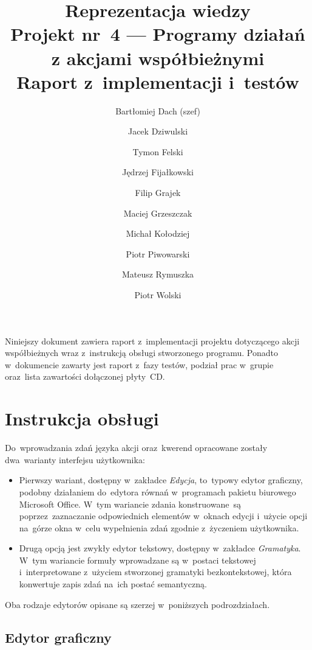 \documentclass[11pt,a4paper]{article}
\begin{document}
\title{Reprezentacja wiedzy \\
\Large{
    Projekt nr~4 --- Programy działań z akcjami współbieżnymi \\
    Raport z~implementacji i~testów
}}
\author{
    Bartłomiej Dach (szef) \and
    Jacek Dziwulski \and
    Tymon Felski \and
    Jędrzej Fijałkowski \and
    Filip Grajek \and
    Maciej Grzeszczak \and
    Michał Kołodziej \and
    Piotr Piwowarski \and
    Mateusz Rymuszka \and
    Piotr Wolski
}
\maketitle

Niniejszy dokument zawiera raport z~implementacji projektu dotyczącego akcji współbieżnych wraz z~instrukcją obsługi stworzonego programu.
Ponadto w~dokumencie zawarty jest raport z~fazy testów, podział prac w~grupie oraz~lista zawartości dołączonej płyty~CD.

\section{Instrukcja obsługi}

Do~wprowadzania zdań języka akcji oraz~kwerend opracowane zostały dwa~warianty interfejsu użytkownika:
\begin{itemize}
    \item Pierwszy wariant, dostępny w~zakładce \emph{Edycja}, to~typowy edytor graficzny, podobny działaniem do~edytora równań w~programach pakietu biurowego Microsoft Office.
    W~tym wariancie zdania konstruowane~są poprzez~zaznaczanie odpowiednich elementów w~oknach edycji i~użycie opcji na~górze okna w~celu wypełnienia zdań zgodnie z~życzeniem użytkownika.
    \item Drugą opcją jest zwykły edytor tekstowy, dostępny w~zakładce \emph{Gramatyka}.
    W~tym wariancie formuły wprowadzane są w~postaci tekstowej i~interpretowane z~użyciem stworzonej gramatyki bezkontekstowej, która konwertuje zapis zdań na~ich postać semantyczną.
\end{itemize}
Oba rodzaje edytorów opisane są szerzej w~poniższych podrozdziałach.

\subsection{Edytor graficzny}
\end{document}
